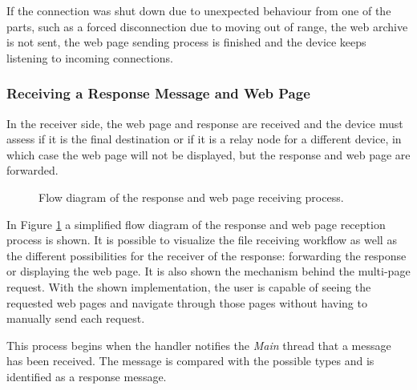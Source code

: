 If the connection was shut down due to unexpected behaviour from one of the parts, such as a forced disconnection due to moving out of range, the web archive is not sent, the web page sending process is finished and the device keeps listening to incoming connections.

\subsubsection{Receiving a Response Message and Web Page}
\label{subsubsec:rcvrsp}

In the receiver side, the web page and response are received and the device must assess if it is the final destination or if it is a relay node for a different device, in which case the web page will not be displayed, but the response and web page are forwarded.

\begin{figure}[ht]
	\noindent{}
	\caption{\label{fig:rsprcvflux} Flow diagram of the response and web page receiving process.}
\end{figure}

In Figure \ref{fig:rsprcvflux} a simplified flow diagram of the response and web page reception process is shown. It is possible to visualize the file receiving workflow as well as the different possibilities for the receiver of the response: forwarding the response or displaying the web page. It is also shown the mechanism behind the multi-page request. With the shown implementation, the user is capable of seeing the requested web pages and navigate through those pages without having to manually send each request.

This process begins when the handler notifies the \textit{Main} thread that a message has been received. The message is compared with the possible types and is identified as a response message.

